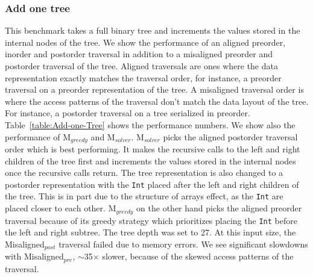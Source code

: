 \documentclass[acmsmall,review,anonymous]{acmart}\settopmatter{printfolios=true,printccs=false,printacmref=false}
\newcommand{\systemSolver}{{\sc M$_{\mathit{solver}}$}\xspace}
\newcommand{\systemGreedy}{{\sc M$_{\mathit{greedy}}$}\xspace}
\newcommand{\misalignedPost}{{\sc Misaligned$_{\mathit{post}}$}\xspace}
\newcommand{\misalignedPre}{{\sc Misaligned$_{\mathit{pre}}$}\xspace}
\begin{document}
\subsubsection{Add one tree}

This benchmark takes a full binary tree and increments the values stored in the internal nodes of the tree. 
We show the performance of an aligned preorder, inorder and postorder traversal in addition to a misaligned 
preorder and postorder traversal of the tree. Aligned traversals are ones where the data representation exactly
matches the traversal order, for instance, a preorder traversal on a preorder representation of the tree. 
A misaligned traversal order is where the access patterns of the traversal don't match the data layout of the tree.
For instance, a postorder traversal on a tree serialized in preorder. 
Table~\ref{table:Add-one-Tree} shows the performance numbers. We show also the performance of \systemGreedy and \systemSolver.
\systemSolver picks the aligned postorder traversal order which is best performing. It makes the recursive calls to the left and right children of the
tree first and increments the values stored in the internal nodes once the recursive calls return. The tree representation is also changed to a postorder
representation with the \lstinline|Int| placed after the left and right children of the tree. 
This is in part due to the structure of arrays effect, as the \lstinline|Int| are placed closer to each other.
\systemGreedy on the other hand picks the 
aligned preorder traversal because of its greedy strategy which prioritizes placing the \lstinline|Int| before the left and right subtree.
The tree depth was set to 27. At this input size, the \misalignedPost traversal failed due to memory errors.
We see significant slowdowns with \misalignedPre, $\sim$35$\times$ slower, because of the skewed access patterns of the traversal.
\end{document}
